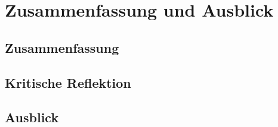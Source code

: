 \section{Zusammenfassung und Ausblick}
\subsection{Zusammenfassung}
\subsection{Kritische Reflektion} 
\subsection{Ausblick}
